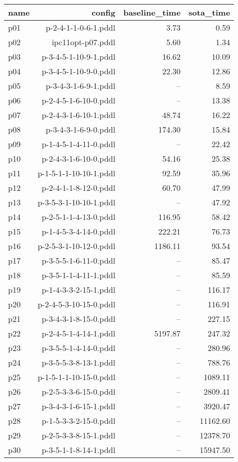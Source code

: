 \documentclass{article}
\begin{document}
                            \begin{center}
                            \scriptsize
                            \begin{tabular}{@{}l|r|r|r@{}}
                            name & config & baseline\_time & sota\_time\\\midrule
                              p01& p-2-4-1-1-0-6-1.pddl&3.73&0.59\\
  p02& ipc11opt-p07.pddl&5.60&1.34\\
  p03& p-3-4-5-1-10-9-1.pddl&16.62&10.09\\
  p04& p-3-4-5-1-10-9-0.pddl&22.30&12.86\\
  p05& p-3-4-3-1-6-9-1.pddl&--&8.59\\
  p06& p-2-4-5-1-6-10-0.pddl&--&13.38\\
  p07& p-2-4-3-1-6-10-1.pddl&48.74&16.22\\
  p08& p-3-4-3-1-6-9-0.pddl&174.30&15.84\\
  p09& p-1-4-5-1-4-11-0.pddl&--&22.42\\
  p10& p-2-4-3-1-6-10-0.pddl&54.16&25.38\\
  p11& p-1-5-1-1-10-10-1.pddl&92.59&35.96\\
  p12& p-2-4-1-1-8-12-0.pddl&60.70&47.99\\
  p13& p-3-5-3-1-10-10-1.pddl&--&47.92\\
  p14& p-2-5-1-1-4-13-0.pddl&116.95&58.42\\
  p15& p-1-4-5-3-4-14-0.pddl&222.21&76.73\\
  p16& p-2-5-3-1-10-12-0.pddl&1186.11&93.54\\
  p17& p-3-5-5-1-6-11-0.pddl&--&85.47\\
  p18& p-3-5-1-1-4-11-1.pddl&--&85.59\\
  p19& p-1-4-3-3-2-15-1.pddl&--&116.17\\
  p20& p-2-4-5-3-10-15-0.pddl&--&116.91\\
  p21& p-3-4-3-1-8-15-0.pddl&--&227.15\\
  p22& p-2-4-5-1-4-14-1.pddl&5197.87&247.32\\
  p23& p-3-5-5-1-4-14-0.pddl&--&280.96\\
  p24& p-3-5-5-3-8-13-1.pddl&--&788.76\\
  p25& p-1-5-1-1-10-15-0.pddl&--&1089.11\\
  p26& p-2-5-3-3-6-15-0.pddl&--&2809.41\\
  p27& p-3-4-3-1-6-15-1.pddl&--&3920.47\\
  p28& p-1-5-3-3-2-15-0.pddl&--&11162.60\\
  p29& p-2-5-3-3-8-15-1.pddl&--&12378.70\\
  p30& p-3-5-1-1-8-14-1.pddl&--&15947.50
                            \end{tabular}
                            \end{center}
                    
\end{document}

